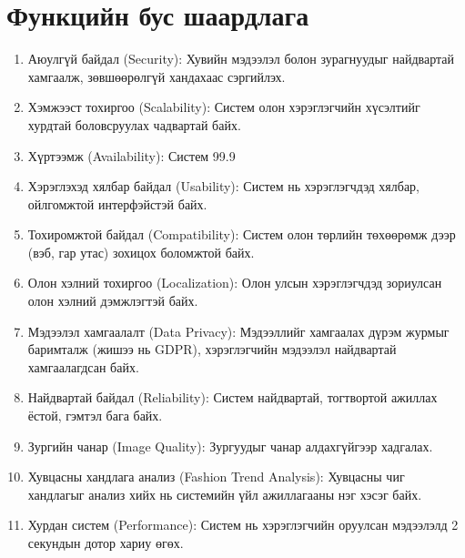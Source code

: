 \section{Функцийн бус шаардлага}
\begin{enumerate}
   \item Аюулгүй байдал (Security): Хувийн мэдээлэл болон зурагнуудыг найдвартай хамгаалж, зөвшөөрөлгүй хандахаас сэргийлэх.
   \item Хэмжээст тохиргоо (Scalability): Систем олон хэрэглэгчийн хүсэлтийг хурдтай боловсруулах чадвартай байх.
   \item Хүртээмж (Availability): Систем 99.9%
   \item Хэрэглэхэд хялбар байдал (Usability): Систем нь хэрэглэгчдэд хялбар, ойлгомжтой интерфэйстэй байх.
   \item Тохиромжтой байдал (Compatibility): Систем олон төрлийн төхөөрөмж дээр (вэб, гар утас) зохицох боломжтой байх.
   \item Олон хэлний тохиргоо (Localization): Олон улсын хэрэглэгчдэд зориулсан олон хэлний дэмжлэгтэй байх.
   \item Мэдээлэл хамгаалалт (Data Privacy): Мэдээллийг хамгаалах дүрэм журмыг баримталж (жишээ нь GDPR), хэрэглэгчийн мэдээлэл найдвартай хамгаалагдсан байх.
   \item Найдвартай байдал (Reliability): Систем найдвартай, тогтвортой ажиллах ёстой, гэмтэл бага байх.
   \item Зургийн чанар (Image Quality): Зургуудыг чанар алдахгүйгээр хадгалах.
   \item Хувцасны хандлага анализ (Fashion Trend Analysis): Хувцасны чиг хандлагыг анализ хийх нь системийн үйл ажиллагааны нэг хэсэг байх.
   \item Хурдан систем (Performance): Систем нь хэрэглэгчийн оруулсан мэдээлэлд 2 секундын дотор хариу өгөх.
\end{enumerate}
